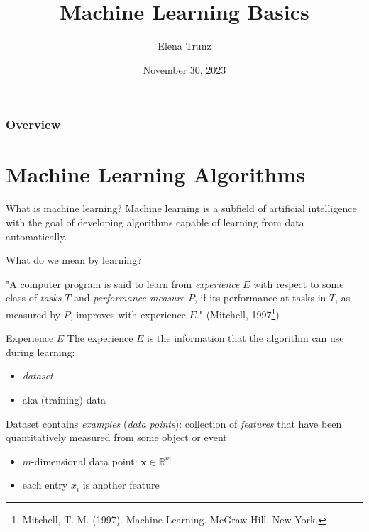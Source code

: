 \documentclass[dvipsnames]{beamer}
\title{Machine Learning Basics}
\date{November 30, 2023}%
\institute{Visual Computing Group, Uni Bonn}
\author{Elena Trunz}
\begin{document}
    \maketitle

    \begin{frame}
    \frametitle{Overview} 
    \tableofcontents
    \end{frame}

   	\let\oldfootnoterule\footnoterule
	\def\footnoterule{\only<3->\oldfootnoterule}
    \section{Machine Learning Algorithms}
    \begin{frame}{What is machine learning?}
			Machine learning is a subfield of artificial intelligence with the goal of developing algorithms capable of learning
from data automatically. \pause

			What do we mean by learning? \pause

			"A computer program is said to learn from \emph{experience} $E$ with respect to some
class of \emph{tasks} $T$ and \emph{performance measure} $P$, if its performance at tasks in $T$, as
measured by $P$, improves with experience $E$." (Mitchell, 1997\footnote<3->{ Mitchell, T. M. (1997). Machine Learning. McGraw-Hill, New York.})

    \end{frame}
		
		\begin{frame}{Experience $E$}
		The experience $E$ is the information that the algorithm can use during learning:
		\begin{itemize}
			\item \emph{dataset} 
			\item aka (training) data
		\end{itemize} \pause

		Dataset contains \emph{examples} (\emph{data points}): collection of \emph{features} that have been quantitatively measured from some object or event
		\begin{itemize}
			\item $m$-dimensional data point: $\mathbf{x} \in \mathbb{R}^m$
			\item each entry $x_i$ is another feature
		\end{itemize}
    \end{frame}
		
\end{document}
